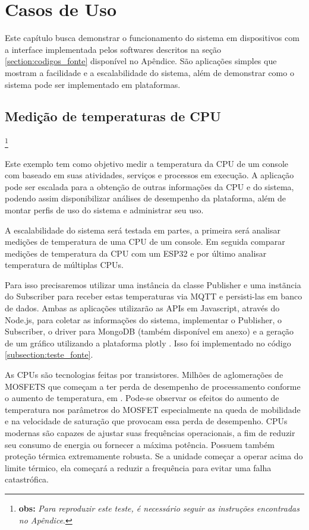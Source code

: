 \chapter{Casos de Uso}
\label{chapter:casos_de_uso}

Este capítulo busca demonstrar o funcionamento do sistema em dispositivos com a interface implementada pelos softwares descritos na seção \ref{section:codigos_fonte} disponível no Apêndice. São aplicações simples que mostram a facilidade e a escalabilidade do sistema, além de demonstrar como o sistema pode ser implementado em plataformas.

\section{Medição de temperaturas de CPU}
\label{section:temp_cpu}

\footnote{\textbf{obs:} \textit{Para reproduzir este teste, é necessário seguir as instruções encontradas no Apêndice}.}

Este exemplo tem como objetivo medir a temperatura da CPU de um console com baseado em suas atividades, serviços e processos em execução. A aplicação pode ser escalada para a obtenção de outras informações da CPU e do sistema, podendo assim disponibilizar análises de desempenho da plataforma, além de montar perfis de uso do sistema e administrar seu uso.

A escalabilidade do sistema será testada em partes, a primeira será analisar medições de temperatura de uma CPU de um console. Em seguida comparar medições de temperatura da CPU com um ESP32 e por último analisar temperatura de múltiplas CPUs.

Para isso precisaremos utilizar uma instância da classe Publisher e uma instãncia do Subscriber para receber estas temperaturas via MQTT e persisti-las em banco de dados. Ambas as aplicações utilizarão as APIs em Javascript, através do Node.js, para coletar as informações do sistema, implementar o Publisher, o Subscriber, o driver para MongoDB (também disponível em anexo) e a geração de um gráfico utilizando a plataforma plotly \cite{plotly}. Isso foi implementado no código \ref{subsection:teste_fonte}.

As CPUs são tecnologias feitas por transistores. Milhões de aglomerações de MOSFETS que começam a  ter perda de desempenho de processamento conforme o aumento de temperatura, em \cite{jose}. Pode-se observar os efeitos do aumento de  temperatura nos parâmetros do MOSFET especialmente na queda de mobilidade e na velocidade de saturação que provocam essa perda de desempenho. CPUs modernas são capazes de ajustar suas frequências operacionais, a fim de reduzir seu consumo de energia ou fornecer a máxima potência. Possuem também proteção térmica extremamente robusta. Se a unidade começar a operar acima do limite térmico, ela começará a reduzir a frequência para evitar uma falha catastrófica.

